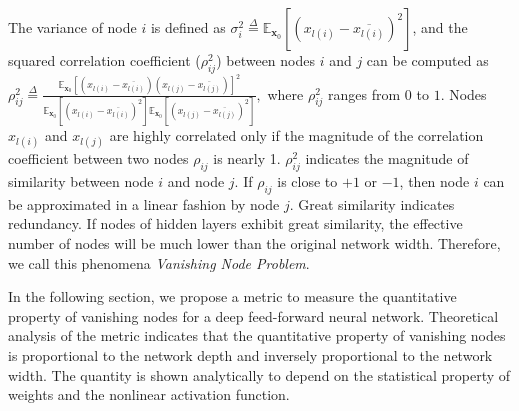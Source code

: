 The variance of node $i$ is defined as $\sigma_i^2\overset{\Delta}{=}\mathbb{E}_{\mathbf{x}_0}[(x_{l(i)}-\overline{x_{l(i)}})^2]$, and the squared correlation coefficient ($\rho_{ij}^2$) between nodes $i$ and $j$ can be computed as $\rho_{ij}^2\overset{\Delta}{=}
\frac
{\mathbb{E}_{\mathbf{x}_0}[(x_{l(i)}-\overline{x_{l(i)}})(x_{l(j)}-\overline{x_{l(j)}})]^2}
{\mathbb{E}_{\mathbf{x}_0}[(x_{l(i)}-\overline{x_{l(i)}})^2]\mathbb{E}_{\mathbf{x}_0}[(x_{l(j)}-\overline{x_{l(j)}})^2]},$
where $\rho_{ij}^2$ ranges from $0$ to $1$.
Nodes $x_{l(i)}$ and $x_{l(j)}$ are highly correlated only if the magnitude of the correlation coefficient between two nodes $\rho_{ij}$ is nearly 1. $\rho_{ij}^2$ indicates the magnitude of similarity between node $i$ and node $j$.
If $\rho_{ij}$ is close to $+1$ or $-1$, then node $i$ can be approximated in a linear fashion by node $j$. Great similarity indicates redundancy. If nodes of hidden layers exhibit great similarity, the effective number of nodes will be much lower than the original network width. Therefore, we call this phenomena \textit{Vanishing Node Problem}.





% 


In the following section, we propose a metric to measure the quantitative property of vanishing nodes for a deep feed-forward neural network.
Theoretical analysis of the metric indicates that the quantitative property of vanishing nodes is proportional to the network depth and inversely proportional to the network width.
The quantity is shown analytically to depend on the statistical property of weights and the nonlinear activation function. 

